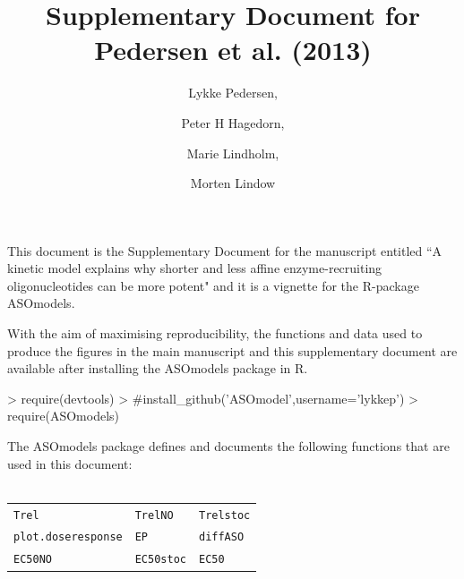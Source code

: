 \documentclass[a4paper,11pt]{article}
\title{Supplementary Document for Pedersen et al. (2013)}
\author{Lykke Pedersen, \and Peter H Hagedorn, \and Marie Lindholm, \and Morten Lindow}
\date{}
\begin{document}

\maketitle

This document is the Supplementary Document for the manuscript entitled ``A kinetic model explains why shorter and less
affine enzyme-recruiting oligonucleotides can be
more potent" and it is a vignette for the R-package ASOmodels.

With the aim of maximising reproducibility, the functions and data used to produce the figures in the main manuscript and this supplementary document are available after installing the ASOmodels package in R.
\begin{Schunk}
\begin{Sinput}
> require(devtools)
> #install_github('ASOmodel',username='lykkep')
> require(ASOmodels)
\end{Sinput}
\end{Schunk}
The ASOmodels package defines and documents the following functions that are used in this document: \\
~\\
\begin{tabular}{l l l}
\texttt{Trel} & \texttt{TrelNO} & \texttt{Trelstoc} \\
\texttt{plot.doseresponse} & \texttt{EP} & \texttt{diffASO} \\
\texttt{EC50NO} & \texttt{EC50stoc} & \texttt{EC50}
\end{tabular}

\tableofcontents

\newpage

\end{document}
